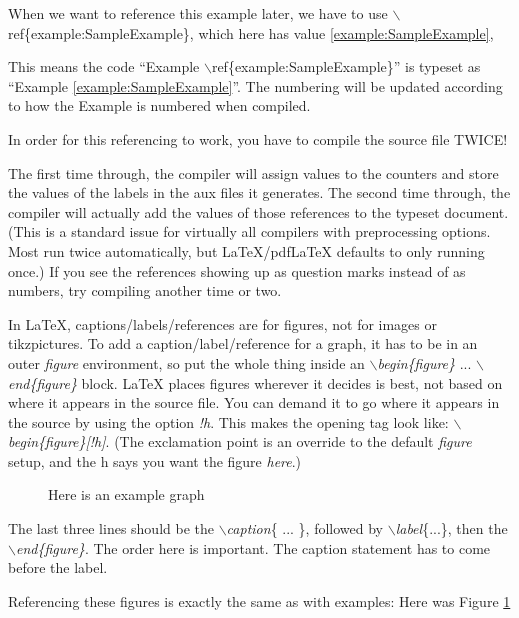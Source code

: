 \documentclass[nooutcomes]{ximera}
\begin{document}
When we want to reference this example later, we have to use $\backslash$ref\{example:SampleExample\}, which here has value \ref{example:SampleExample},

This means the code ``Example $\backslash$ref\{example:SampleExample\}'' is typeset as ``Example \ref{example:SampleExample}''. 
The numbering will be updated according to how the Example is numbered when compiled. 

\begin{callout}
	In order for this referencing to work, you have to compile the source file TWICE!
\end{callout}

The first time through, the compiler will assign values to the counters and store the values of the labels in the aux files it generates. The second time
through, the compiler will actually add the values of those references to the typeset document. (This is a standard issue for virtually all compilers with 
preprocessing options. Most run twice automatically, but LaTeX/pdfLaTeX  defaults to only running once.) If you see the references showing up as 
question marks instead of as numbers, try compiling another time or two.

In \LaTeX,  captions/labels/references are for figures, not for images or tikzpictures. To add a caption/label/reference for a graph, it has to be in an outer
 \emph{figure} environment, so put the whole thing inside an $\backslash$\emph{begin\{figure\}} ... $\backslash$\emph{end\{figure\}} block. 
 LaTeX  places figures wherever it decides is best, not based on where it appears in the source file. You can demand it to go where it appears in the source 
 by using the option \emph{!h}. This makes the opening tag look like: $\backslash$\emph{begin\{figure\}[!h]}. 
 (The exclamation point is an override to the default \emph{figure} setup, and the h says you want the figure \emph{here}.)

\begin{figure}[!h]
	\begin{image}
	\end{image}
	\caption{Here is an example graph}
	\label{fig:pic}
\end{figure}

The last three lines should be the $\backslash$\emph{caption}\{ ... \}, followed by $\backslash$\emph{label}\{...\}, then the $\backslash$\emph{end\{figure\}}. 
The order here is important. The caption statement has to come before the label.

Referencing these figures is exactly the same as with examples: Here was Figure \ref{fig:pic}
\end{document}
